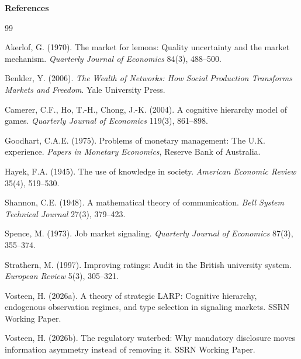 \documentclass[11pt]{article}
\begin{document}
\vspace{0.5cm}
\noindent\textbf{References}

\begin{thebibliography}{99}

 Akerlof, G. (1970). The market for lemons: Quality uncertainty and the market mechanism. \textit{Quarterly Journal of Economics} 84(3), 488--500.

 Benkler, Y. (2006). \textit{The Wealth of Networks: How Social Production Transforms Markets and Freedom}. Yale University Press.

 Camerer, C.F., Ho, T.-H., Chong, J.-K. (2004). A cognitive hierarchy model of games. \textit{Quarterly Journal of Economics} 119(3), 861--898.

 Goodhart, C.A.E. (1975). Problems of monetary management: The U.K. experience. \textit{Papers in Monetary Economics}, Reserve Bank of Australia.

 Hayek, F.A. (1945). The use of knowledge in society. \textit{American Economic Review} 35(4), 519--530.

 Shannon, C.E. (1948). A mathematical theory of communication. \textit{Bell System Technical Journal} 27(3), 379--423.

 Spence, M. (1973). Job market signaling. \textit{Quarterly Journal of Economics} 87(3), 355--374.

 Strathern, M. (1997). Improving ratings: Audit in the British university system. \textit{European Review} 5(3), 305--321.

 Vosteen, H. (2026a). A theory of strategic LARP: Cognitive hierarchy, endogenous observation regimes, and type selection in signaling markets. SSRN Working Paper.

 Vosteen, H. (2026b). The regulatory waterbed: Why mandatory disclosure moves information asymmetry instead of removing it. SSRN Working Paper.

\end{thebibliography}
\end{document}
